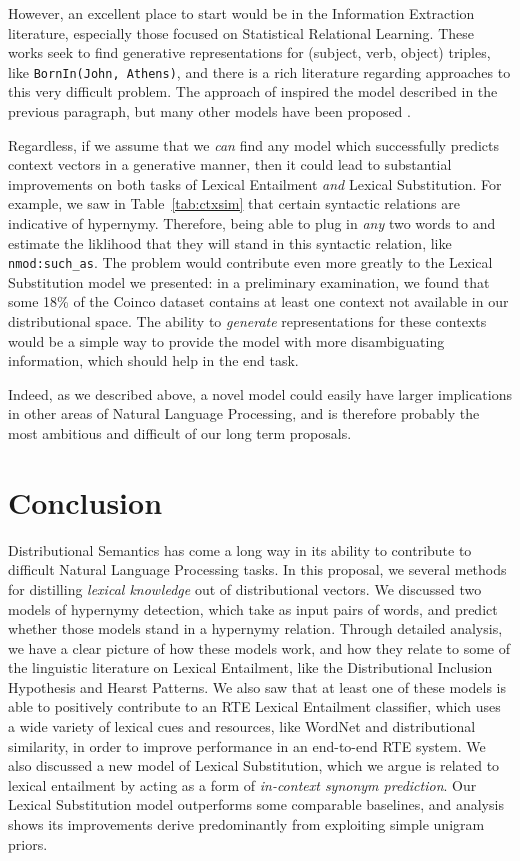 \documentclass[12pt]{article}
\begin{document}
However, an excellent place to start would be in the Information Extraction
literature, especially those focused on Statistical Relational Learning. These
works seek to find generative representations for (subject, verb, object)
triples, like {\tt BornIn(John, Athens)}, and there is a rich literature
regarding approaches to this very difficult problem.
The approach of  inspired the model described
in the previous paragraph, but many other models have been proposed
\cite{socher:2013:nips,riedel:2013:naacl,yang:2014:iclr,kuleshov:2015:aistats,trouillon:2016:icml}.

Regardless, if we assume that we {\em can} find any model which successfully
predicts context vectors in a generative manner, then it could lead to
substantial improvements on both tasks of Lexical Entailment {\em and} Lexical
Substitution. For example, we saw in Table~\ref{tab:ctxsim} that certain
syntactic relations are indicative of hypernymy. Therefore, being able to plug
in {\em any} two words to and estimate the liklihood that they will stand in this
syntactic relation, like {\tt nmod:such\_as}.
The problem would contribute even more greatly to the Lexical Substitution
model we presented: in a preliminary examination, we found that some 18\% of the Coinco
dataset contains at least one context not available in our distributional space.
The ability to {\em generate} representations for these contexts would be
a simple way to provide the model with more disambiguating information, which
should help in the end task.

Indeed, as we described above, a novel model could easily have larger
implications in other areas of Natural Language Processing, and is therefore
probably the most ambitious and difficult of our long term proposals.

\pagebreak
\section{Conclusion}

Distributional Semantics has come a long way in its ability to contribute to
difficult Natural Language Processing tasks. In this proposal, we several
methods for distilling {\em lexical knowledge} out of distributional vectors.
We discussed two models of hypernymy detection, which take as input pairs of
words, and predict whether those models stand in a hypernymy relation.  Through
detailed analysis, we have a clear picture of how these models work, and how
they relate to some of the linguistic literature on Lexical Entailment, like
the Distributional Inclusion Hypothesis and Hearst Patterns. We also saw that
at least one of these models is able to positively contribute to an RTE Lexical
Entailment classifier, which uses a wide variety of lexical cues and resources,
like WordNet and distributional similarity, in order to improve performance in
an end-to-end RTE system. We also discussed a new model of Lexical
Substitution, which we argue is related to lexical entailment by acting as a
form of {\em in-context synonym prediction}. Our Lexical Substitution model
outperforms some comparable baselines, and analysis shows its improvements
derive predominantly from exploiting simple unigram priors.
\end{document}
